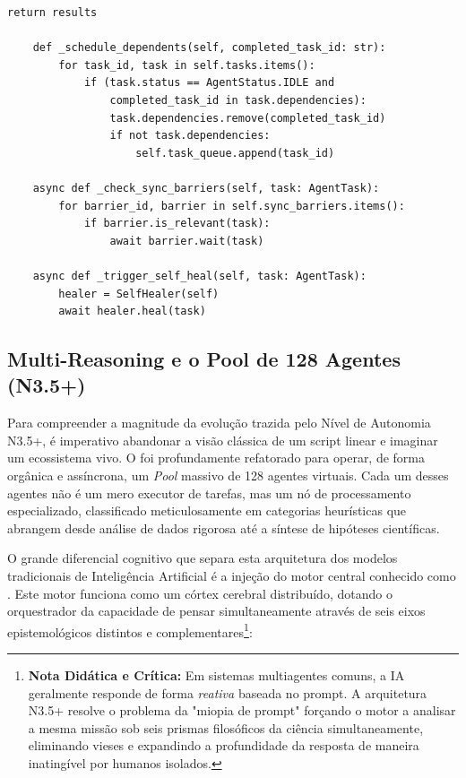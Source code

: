 \begin{lstlisting}[style=pythonstyle, caption={Meta-orquestrador Nexus},
                   label={lst:meta-orchestrator}]
        return results

    def _schedule_dependents(self, completed_task_id: str):
        for task_id, task in self.tasks.items():
            if (task.status == AgentStatus.IDLE and
                completed_task_id in task.dependencies):
                task.dependencies.remove(completed_task_id)
                if not task.dependencies:
                    self.task_queue.append(task_id)

    async def _check_sync_barriers(self, task: AgentTask):
        for barrier_id, barrier in self.sync_barriers.items():
            if barrier.is_relevant(task):
                await barrier.wait(task)

    async def _trigger_self_heal(self, task: AgentTask):
        healer = SelfHealer(self)
        await healer.heal(task)
\end{lstlisting}

\subsection{Multi-Reasoning e o Pool de 128 Agentes (N3.5+)}
Para compreender a magnitude da evolução trazida pelo Nível de Autonomia N3.5+, é imperativo abandonar a visão clássica de um script linear e imaginar um ecossistema vivo. O  foi profundamente refatorado para operar, de forma orgânica e assíncrona, um \emph{Pool} massivo de 128 agentes virtuais. Cada um desses agentes não é um mero executor de tarefas, mas um nó de processamento especializado, classificado meticulosamente em categorias heurísticas que abrangem desde análise de dados rigorosa até a síntese de hipóteses científicas.

O grande diferencial cognitivo que separa esta arquitetura dos modelos tradicionais de Inteligência Artificial é a injeção do motor central conhecido como . Este motor funciona como um córtex cerebral distribuído, dotando o orquestrador da capacidade de pensar simultaneamente através de seis eixos epistemológicos distintos e complementares\footnote{\textbf{Nota Didática e Crítica:} Em sistemas multiagentes comuns, a IA geralmente responde de forma \emph{reativa} baseada no prompt. A arquitetura N3.5+ resolve o problema da "miopia de prompt" forçando o motor a analisar a mesma missão sob seis prismas filosóficos da ciência simultaneamente, eliminando vieses e expandindo a profundidade da resposta de maneira inatingível por humanos isolados.}:


